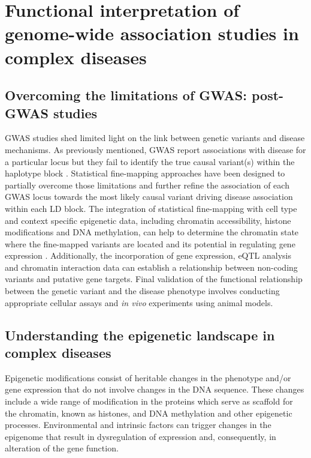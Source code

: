 \section{Functional interpretation of genome-wide association studies in complex diseases}

\subsection{Overcoming the limitations of GWAS: post-GWAS studies}
GWAS studies shed limited light on the link between genetic variants and disease mechanisms. As previously mentioned, GWAS report associations with disease for a particular locus but they fail to identify the true causal variant(s) within the haplotype block \parencite{Edwards2013}. Statistical fine-mapping approaches have been designed to partially overcome those limitations and further refine the association of each GWAS locus towards the most likely causal variant driving disease association within each LD block. The integration of statistical fine-mapping with cell type and context specific epigenetic data, including chromatin accessibility, histone modifications and DNA methylation, can help to determine the chromatin state where the fine-mapped variants are located and its potential in regulating gene expression . Additionally, the incorporation of gene expression, eQTL analysis and chromatin interaction data can establish a relationship between non-coding variants and putative gene targets. Final validation of the functional relationship between the genetic variant and the disease phenotype involves conducting appropriate cellular assays and \textit{in vivo} experiments using animal models.



\subsection{Understanding the epigenetic landscape in complex diseases}
\label{subsec:Epigenetics}

Epigenetic modifications consist of heritable changes in the phenotype and/or gene expression that do not involve changes in the DNA sequence\parencite{Feil2012}. These changes include a wide range of modification in the proteins which serve as scaffold for the chromatin, known as histones, and DNA methylation and other epigenetic processes. Environmental and intrinsic factors can trigger changes in the epigenome that result in dysregulation of expression and, consequently, in alteration of the gene function.

